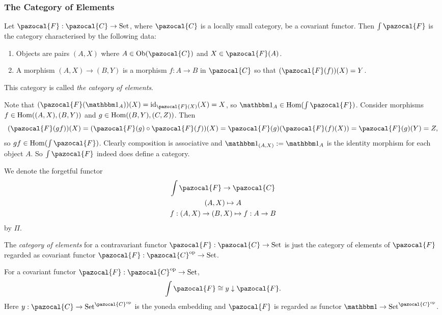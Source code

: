 \subsubsection{The Category of Elements}
\begin{definition}
    Let $\pazocal{F}: \pazocal{C}\rightarrow\mathrm{Set}$, where $\pazocal{C}$ is a locally small category, be a covariant functor. Then $\int \pazocal{F}$ is the category characterised by the following data: 
    \begin{enumerate}
        \item Objects are pairs $(A,X)$ where $A\in \Ob(\pazocal{C})$ and $X\in \pazocal{F}(A)$.
        \item A morphism $(A,X)\rightarrow (B,Y)$ is a morphism $f: A\rightarrow B$ in $\pazocal{C}$ so that $(\pazocal{F}(f))(X)=Y$.
    \end{enumerate} 
    This category is called \emph{the category of elements}.
\end{definition}
\begin{remark}
    Note that $(\pazocal{F}(\fone_A))(X)=\id_{\pazocal{F}(X)}(X)=X$, so $\fone_A\in \Hom(\int\pazocal{F})$. Consider morphisms $f\in \mathrm{Hom}((A,X),(B,Y))$ and $g\in \mathrm{Hom}((B,Y),(C,Z))$. Then 
    $$(\pazocal{F}(gf))(X)=(\pazocal{F}(g)\circ \pazocal{F}(f))(X)= \pazocal{F}(g)(\pazocal{F}(f)(X))=\pazocal{F}(g)(Y)=Z,$$
    so $gf\in \Hom(\int\pazocal{F})$. Clearly composition is associative and $\fone_{(A,X)}:=\fone_A$ is the identity morphism for each object $A$. So $\int\pazocal{F}$ indeed does define a category.
\end{remark}
We denote the forgetful functor 
\begin{gather*}
    \int\pazocal{F} \rightarrow \pazocal{C}\\
    (A,X)\mapsto A\\
    f: (A,X)\rightarrow (B,X) \mapsto f: A\rightarrow B
\end{gather*}
by $\Pi$. 
\begin{definition}
    The \emph{category of elements} for a contravariant functor $\pazocal{F}:\pazocal{C}\rightarrow \mathrm{Set}$ is just the category of elements of $\pazocal{F}$ regarded as covariant functor $\pazocal{F} :\pazocal{C}\op\rightarrow \mathrm{Set}$.
\end{definition}
\begin{lemma}
    For a covariant functor $\pazocal{F}:\pazocal{C}\op \rightarrow \mathrm{Set}$, 
    $$\int\pazocal{F} \cong y \downarrow \pazocal{F}.$$
    Here $y: \pazocal{C}\rightarrow \mathrm{Set}^{\pazocal{C}\op}$ is the yoneda embedding and $\pazocal{F}$ is regarded as functor $\fone\rightarrow \mathrm{Set}^{\pazocal{C}\op}$.
\end{lemma}
